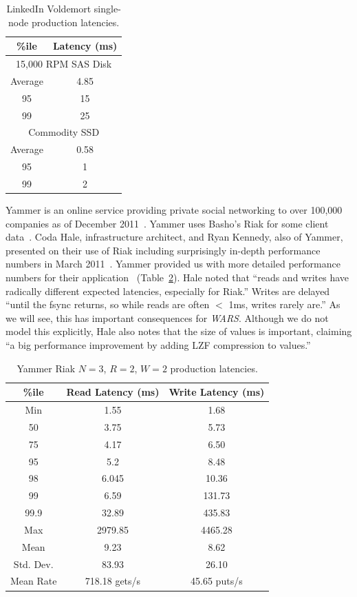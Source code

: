 \documentclass{vldb}
\begin{document}
\begin{table}
\centering
\begin{tabular}{|c|c|}
\hline
\%ile & Latency (ms) \\
\hline
\multicolumn{2}{|c|}{ 15,000 RPM SAS Disk}\\
\hline
Average & 4.85\\
95 & 15\\
99 & 25\\
\hline
\multicolumn{2}{|c|}{ Commodity SSD }\\
\hline
Average & 0.58 \\
95 & 1\\
99 & 2\\
\hline
\end{tabular}
\vspace{-6pt}
\caption{LinkedIn Voldemort single-node production latencies.}
\vspace{-4pt}
\label{table:linkedin}
\end{table}

Yammer is an online service providing private social networking to
over 100,000 companies as of December 2011~\cite{yammer}.  Yammer uses
Basho's Riak for some client data~\cite{riak}.  Coda Hale,
infrastructure architect, and Ryan Kennedy, also of Yammer, presented
on their use of Riak including surprisingly in-depth performance
numbers in March 2011~\cite{riakyammer}.  Yammer provided us with more
detailed performance numbers for their application~\cite{codapc}
(Table~\ref{table:yammer}).  Hale noted that ``reads and writes have
radically different expected latencies, especially for Riak.''  Writes
are delayed ``until the fsync returns, so while reads are often $<$
1ms, writes rarely are.''  As we will see, this has important
consequences for \textit{WARS}.  Although we do not model this
explicitly, Hale also notes that the size of values is important,
claiming ``a big performance improvement by adding LZF compression to
values.''

\begin{table}
\centering
\begin{tabular}{|c|c|c|}
\hline
\%ile & Read Latency (ms) & Write Latency (ms)\\
\hline
Min & 1.55 & 1.68\\
50 & 3.75 & 5.73 \\
75 & 4.17 & 6.50\\
95 & 5.2 & 8.48\\
98 & 6.045 & 10.36 \\
99 & 6.59 & 131.73\\
99.9 & 32.89 & 435.83\\
Max & 2979.85 &  4465.28 \\
\hline
Mean & 9.23 & 8.62 \\
Std. Dev. & 83.93 & 26.10\\
\hline
Mean Rate & 718.18 gets/s & 45.65 puts/s\\
\hline
\end{tabular}
\vspace{-4pt}
\caption{Yammer Riak $N$$=$$3$, $R$$=$$2$, $W$$=$$2$ production latencies.}
\vspace{-12pt}
\label{table:yammer}
\end{table}
\end{document}
